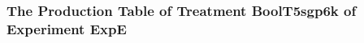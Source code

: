  \begin{frame}
 \fontsize{8pt}{9pt}\selectfont
 \frametitle{ The Production Table of Treatment BoolT5sgp6k of Experiment ExpE }

 \label{ExpEGrammarTable013.tex}  
 \end{frame}

